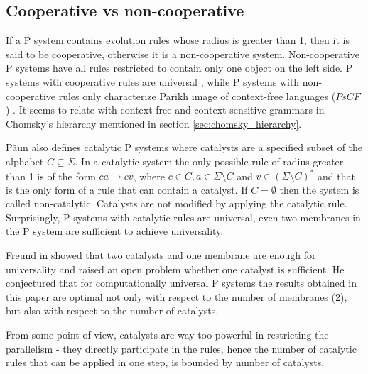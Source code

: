 
\subsection{Cooperative vs non-cooperative} %
\label{sub:context_in_rules}


If a P system contains evolution rules whose radius is greater than 1, then it is said to be  cooperative, otherwise it is a non-cooperative system. Non-cooperative P systems have all rules restricted to contain only one object on the left side.
P systems with cooperative rules are universal \cite{Paun98}, while P systems with non-cooperative rules only characterize Parikh image of context-free languages ($PsCF$) \cite{Sburlan05dragos}. It seems to relate with context-free and context-sensitive grammars in Chomsky's hierarchy mentioned in section \ref{sec:chomsky_hierarchy}. 


P\u{a}un \cite{Paun98} also defines  catalytic P systems where catalysts are a specified subset of the alphabet $C\subseteq \Sigma$. In a catalytic system the only possible rule of radius greater than 1 is of the form $ca\rightarrow cv$, where $c\in C, a\in \Sigma\setminus C$ and $v\in (\Sigma\setminus C)^*$ and that is the only form of a rule that can contain a catalyst. If $C=\emptyset$ then the system is called non-catalytic. Catalysts are not modified by applying the catalytic rule. Surprisingly, P systems with catalytic rules are universal, even two membranes in the P system are sufficient to achieve universality.


Freund in \cite{Freund2005TwoCatalysts} showed that two catalysts and one membrane are enough for universality and raised an open problem whether one catalyst is sufficient. He conjectured that for computationally universal P systems the results obtained in this paper are optimal not only with respect to the number of membranes (2), but also with respect to the number of catalysts.


From some point of view, catalysts are way too powerful in restricting the parallelism - they directly participate in the rules, hence the number of catalytic rules that can be applied in one step, is bounded by number of catalysts.

